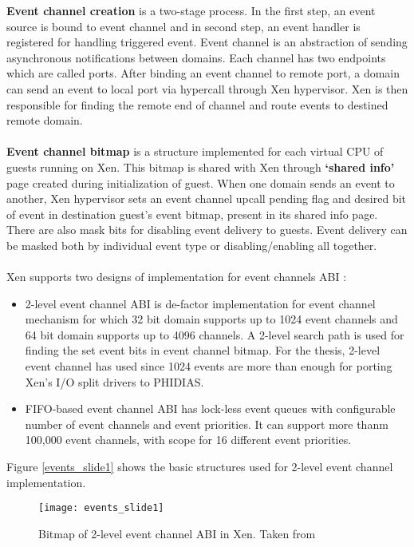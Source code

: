 \textbf{Event channel creation} is a two-stage process. In the first step, an event source is bound to event channel and in second step, an event handler is registered for handling triggered event. Event channel is an abstraction of sending asynchronous notifications between domains. Each channel has two endpoints which are called ports. After binding an event channel to remote port, a domain can send an event to local port via hypercall through Xen hypervisor. Xen is then responsible for finding the remote end of channel and route events to destined remote domain.
\\
\\
\textbf{Event channel bitmap} is a structure implemented for each virtual CPU of guests running on Xen. This bitmap is shared with Xen through \textbf{`shared info'} page created during initialization of guest. When one domain sends an event to another, Xen hypervisor sets an event channel upcall pending flag and desired bit of event in destination guest's event bitmap, present in its shared info page. There are also mask bits for disabling event delivery to guests. Event delivery can be masked both by individual event type or disabling/enabling all together.
\\
\\
Xen supports two designs of implementation for event channels ABI \cite{xen_events}:
\begin{itemize}
	\item 2-level event channel ABI is de-factor implementation for event channel mechanism for which 32 bit domain supports up to 1024 event channels and 64 bit domain supports up to 4096 channels. A 2-level search path is used for finding the set event bits in event channel bitmap. For the thesis, 2-level event channel has used since 1024 events are more than enough for porting Xen's I/O split drivers to PHIDIAS.
	\item FIFO-based event channel ABI has lock-less event queues with configurable number of event channels and event priorities. It can support more thanm 100,000 event channels, with scope for 16 different event priorities.
\end{itemize}
Figure \ref{events_slide1} shows the basic structures used for 2-level event channel implementation.

\begin{figure}[!htbp]
	\centering
	\texttt{[image: events\_slide1]}
	\caption{Bitmap of 2-level event channel ABI in Xen. Taken from \cite{events_slide}}
	\label{events_slide}
\end{figure}
